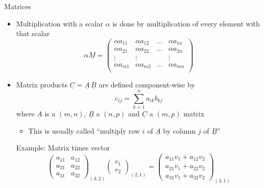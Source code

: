   \begin{frame}{Matrices}
    \begin{itemize}
      \item Multiplication with a scalar $\alpha$ is done by multiplication of
        every element with that scalar
        \begin{equation*}
          \alpha \underline{M} =
          \begin{pmatrix}
            \alpha a_{11} & \alpha a_{12} & \dots & \alpha a_{1n} \\
            \alpha a_{21} & \alpha a_{22} & \dots & \alpha a_{2n} \\
            \vdots & \vdots & & \vdots \\
            \alpha a_{m1} & \alpha a_{m2} & \dots & \alpha a_{mn} \\
          \end{pmatrix}
        \end{equation*}
      \item Matrix products $\underline{C} = \underline{A}\,\underline{B}$ are
        defined component-wise by
        \begin{equation*}
          c_{ij} = \sum_{k=1}^{n} a_{ik}b_{kj}
        \end{equation*}
        where $\underline{A}$ is a $(m, n)$, $\underline{B}$ a $(n, p)$ and
        $\underline{C}$ a $(m, p)$ matrix
        \begin{itemize}
          \item This is usually called
            \enquote{multiply row $i$ of $\underline{A}$ by
                     column $j$ of $\underline{B}$}
        \end{itemize}
      \begin{exampleblock}{Example: Matrix times vector}
        \begin{equation*}
          \begin{pmatrix}
            a_{11} & a_{12} \\ a_{21} & a_{22} \\ a_{31} & a_{32}
          \end{pmatrix}_{(3,2)}
            \begin{pmatrix}v_1 \\ v_2\end{pmatrix}_{(2,1)} =
          \begin{pmatrix}
            a_{11}v_1 + a_{12}v_2 \\
            a_{21}v_1 + a_{22}v_2 \\
            a_{31}v_1 + a_{32}v_2
          \end{pmatrix}_{(3,1)}
        \end{equation*}
      \end{exampleblock}
    \end{itemize}
  \end{frame}

